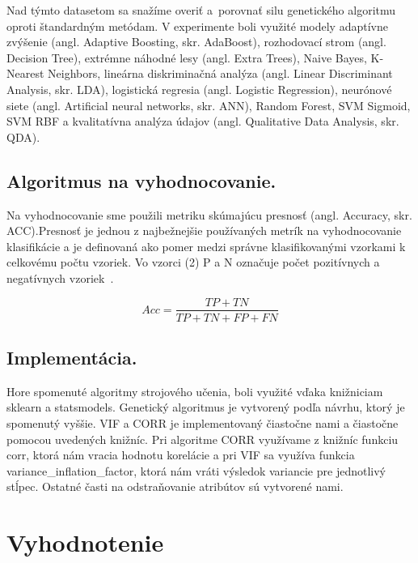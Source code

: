 \documentclass[runningheads]{llncs}
\begin{document}
Nad týmto datasetom sa snažíme overiť a~porovnať silu genetického algoritmu oproti štandardným metódam. V experimente boli využité modely
adaptívne zvýšenie
(angl. Adaptive Boosting, skr. AdaBoost), rozhodovací strom (angl. Decision Tree), extrémne náhodné lesy (angl. Extra Trees), Naive Bayes, K-Nearest Neighbors, lineárna diskriminačná analýza (angl. Linear Discriminant Analysis, skr. LDA), 
logistická regresia (angl. Logistic Regression), neurónové siete (angl. Artificial neural networks, skr. ANN), Random Forest, SVM Sigmoid, SVM RBF a kvalitatívna analýza údajov (angl. Qualitative Data Analysis, skr. QDA).

\subsection{Algoritmus na vyhodnocovanie.}

Na vyhodnocovanie sme použili metriku skúmajúcu presnosť (angl. Accuracy, skr. ACC).Presnosť je jednou z najbežnejšie používaných metrík na vyhodnocovanie klasifikácie a je definovaná ako pomer medzi správne klasifikovanými vzorkami k celkovému počtu vzoriek. 
Vo vzorci (2) P a N označuje počet pozitívnych a negatívnych vzoriek~\cite{ref_sokolova}.

\begin{equation}
Acc = \frac{TP+TN}{TP+TN+FP+FN}
\end{equation}  

\subsection{Implementácia.}

Hore spomenuté algoritmy strojového učenia, boli využité vďaka knižniciam sklearn a statsmodels. Genetický algoritmus je vytvorený podľa návrhu, ktorý je spomenutý vyššie. VIF a CORR je implementovaný čiastočne nami a čiastočne pomocou uvedených knižníc. Pri algoritme CORR využívame z knižníc funkciu corr, ktorá nám vracia hodnotu korelácie a pri VIF sa využíva funkcia variance\_inflation\_factor, ktorá nám vráti výsledok variancie pre jednotlivý stĺpec. Ostatné časti na odstraňovanie atribútov sú vytvorené nami.

\section{Vyhodnotenie}
\end{document}
